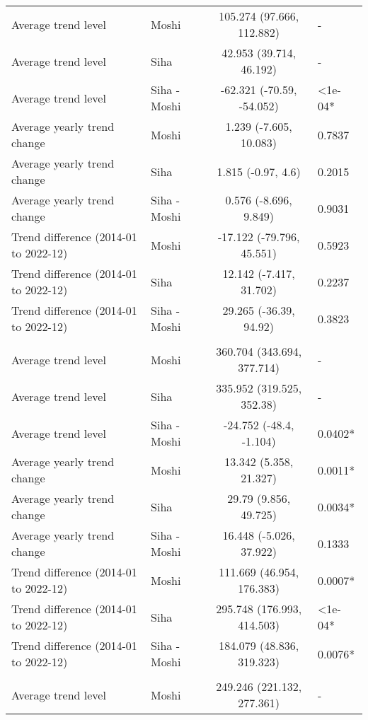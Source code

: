 \begin{longtable}{l|lcl}
\midrule\addlinespace[2.5pt]
\multicolumn{4}{l}{Other Cardiovascular Diseases} \\ 
\midrule\addlinespace[2.5pt]
Average trend level & Moshi & 105.274 (97.666, 112.882) & - \\ 
Average trend level & Siha & 42.953 (39.714, 46.192) & - \\ 
Average trend level & Siha - Moshi & -62.321 (-70.59, -54.052) & <1e-04* \\ 
Average yearly trend change & Moshi & 1.239 (-7.605, 10.083) & 0.7837 \\ 
Average yearly trend change & Siha & 1.815 (-0.97, 4.6) & 0.2015 \\ 
Average yearly trend change & Siha - Moshi & 0.576 (-8.696, 9.849) & 0.9031 \\ 
Trend difference (2014-01 to 2022-12) & Moshi & -17.122 (-79.796, 45.551) & 0.5923 \\ 
Trend difference (2014-01 to 2022-12) & Siha & 12.142 (-7.417, 31.702) & 0.2237 \\ 
Trend difference (2014-01 to 2022-12) & Siha - Moshi & 29.265 (-36.39, 94.92) & 0.3823 \\ 
\midrule\addlinespace[2.5pt]
\multicolumn{4}{l}{Peptic Ulcers} \\ 
\midrule\addlinespace[2.5pt]
Average trend level & Moshi & 360.704 (343.694, 377.714) & - \\ 
Average trend level & Siha & 335.952 (319.525, 352.38) & - \\ 
Average trend level & Siha - Moshi & -24.752 (-48.4, -1.104) & 0.0402* \\ 
Average yearly trend change & Moshi & 13.342 (5.358, 21.327) & 0.0011* \\ 
Average yearly trend change & Siha & 29.79 (9.856, 49.725) & 0.0034* \\ 
Average yearly trend change & Siha - Moshi & 16.448 (-5.026, 37.922) & 0.1333 \\ 
Trend difference (2014-01 to 2022-12) & Moshi & 111.669 (46.954, 176.383) & 0.0007* \\ 
Trend difference (2014-01 to 2022-12) & Siha & 295.748 (176.993, 414.503) & <1e-04* \\ 
Trend difference (2014-01 to 2022-12) & Siha - Moshi & 184.079 (48.836, 319.323) & 0.0076* \\ 
\midrule\addlinespace[2.5pt]
\multicolumn{4}{l}{Pneumonia, Severe} \\ 
\midrule\addlinespace[2.5pt]
Average trend level & Moshi & 249.246 (221.132, 277.361) & - \\ 

\end{longtable}
